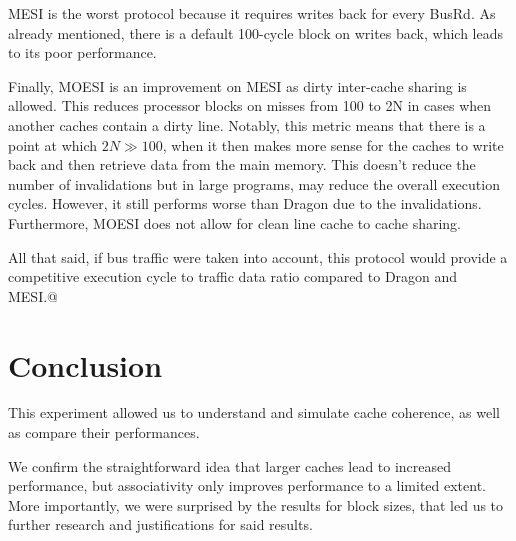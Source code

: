 \documentclass[date,tikzlibs,lmodern,10pt]{epreport}
\begin{document}
MESI is the worst protocol because it requires writes back for every BusRd.
As already mentioned, there is a default 100-cycle block on writes back, which leads to its poor performance.

Finally, MOESI is an improvement on MESI as dirty inter-cache sharing is allowed. This reduces processor blocks on misses from 100 to 2N in cases when another caches contain a dirty line. Notably, this metric means that there is a point at which \(2N \gg 100\), when it then makes more sense for the caches to write back and then retrieve data from the main memory.
This doesn't reduce the number of invalidations but in large programs, may reduce the overall execution cycles.
However, it still performs worse than Dragon due to the invalidations.
Furthermore, MOESI does not allow for clean line cache to cache sharing.

All that said, if bus traffic were taken into account, this protocol would provide a competitive execution cycle to traffic data ratio compared to Dragon and MESI.@\

\section{Conclusion}
This experiment allowed us to understand and simulate cache coherence, as well as compare their performances.

We confirm the straightforward idea that larger caches lead to increased performance, but associativity only improves performance to a limited extent.
More importantly, we were surprised by the results for block sizes, that led us to further research and justifications for said results.
\end{document}

